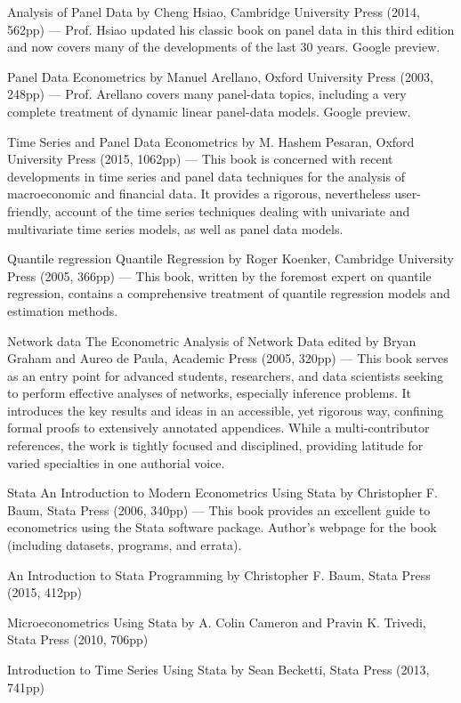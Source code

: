 Analysis of Panel Data by Cheng Hsiao, Cambridge University Press (2014, 562pp) --- Prof. Hsiao updated his classic book on panel data in this third edition and now covers many of the developments of the last 30 years. Google preview.

Panel Data Econometrics by Manuel Arellano, Oxford University Press (2003, 248pp) --- Prof. Arellano covers many panel-data topics, including a very complete treatment of dynamic linear panel-data models.  Google preview.

Time Series and Panel Data Econometrics by M. Hashem Pesaran, Oxford University Press (2015, 1062pp) --- This book is concerned with recent developments in time series and panel data techniques for the analysis of macroeconomic and financial data. It provides a rigorous, nevertheless user-friendly, account of the time series techniques dealing with univariate and multivariate time series models, as well as panel data models.

Quantile regression
Quantile Regression by Roger Koenker, Cambridge University Press (2005, 366pp) --- This book, written by the foremost expert on quantile regression, contains a comprehensive treatment of quantile regression models and estimation methods.

Network data
The Econometric Analysis of Network Data edited by Bryan Graham and Aureo de Paula, Academic Press (2005, 320pp) --- This book serves as an entry point for advanced students, researchers, and data scientists seeking to perform effective analyses of networks, especially inference problems. It introduces the key results and ideas in an accessible, yet rigorous way, confining formal proofs to extensively annotated appendices. While a multi-contributor references, the work is tightly focused and disciplined, providing latitude for varied specialties in one authorial voice.

Stata
An Introduction to Modern Econometrics Using Stata by Christopher F. Baum, Stata Press (2006, 340pp) --- This book provides an excellent guide to econometrics using the Stata software package.  Author's webpage for the book (including datasets, programs, and errata).

An Introduction to Stata Programming by Christopher F. Baum, Stata Press (2015, 412pp)

Microeconometrics Using Stata by A. Colin Cameron and Pravin K. Trivedi, Stata Press (2010, 706pp)

Introduction to Time Series Using Stata by Sean Becketti, Stata Press (2013, 741pp)

